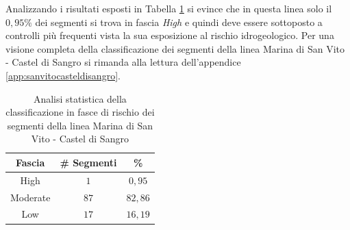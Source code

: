 \newline
Analizzando i risultati esposti in Tabella \ref{percentualesanvitocasteldisangro} si evince che in questa linea solo il $0,95\%$ dei segmenti si trova in fascia \textit{High} e quindi deve essere sottoposto a controlli più frequenti vista la sua esposizione al rischio idrogeologico. 
Per una visione completa della classificazione dei segmenti della linea Marina di San Vito - Castel di Sangro si rimanda alla lettura dell'appendice \ref{app:sanvitocasteldisangro}.
\begin{table}[hpt]
\centering
\begin{tabular}{|c|c|c|}
\hline \rowcolor{lightgray}
Fascia   & \# Segmenti & \%    \\ \hline \rowcolor{flamingopink}
High     & $1$           & $0,95$     \\ \hline \rowcolor{icterine}
Moderate & $87$          & $82,86$ \\ \hline \rowcolor{inchworm}
Low      & $17$          & $16,19$ \\ \hline
\end{tabular}
\caption{Analisi statistica della classificazione in fasce di rischio dei segmenti della linea Marina di San Vito - Castel di Sangro}
\label{percentualesanvitocasteldisangro}
\end{table}
\newpage

